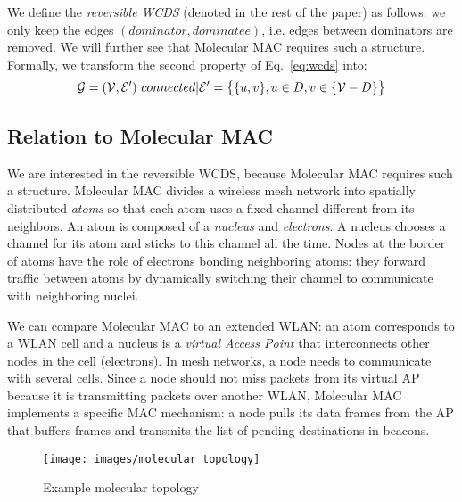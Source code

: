 \documentclass[twoside]{article}
\begin{document}
We define the \emph{reversible WCDS} (denoted \rwcds in the rest of the paper) as follows: we only keep the
edges $(dominator,dominatee)$, i.e. edges between dominators are
removed. We will further see that Molecular MAC requires such a
structure. Formally, we transform the second property of
Eq.~\ref{eq:wcds} into:
\begin{equation}
	\mathcal{G}=(\mathcal{V},\mathcal{E}')\ connected | \mathcal{E}'=\big\{ \{u,v\},  u  \in D, v \in \{\mathcal{V}-D\}\big\}
\label{eq:reversible_wcds}
\end{equation}




\subsection{Relation to Molecular MAC}

We are interested in the reversible WCDS, because Molecular MAC
\cite{molecular09rr} requires such a structure.  Molecular MAC divides
a wireless mesh network into spatially distributed \emph{atoms} so that each
atom uses a fixed channel different from its neighbors. An atom is
composed of a \emph{nucleus} and \emph{electrons}. A nucleus chooses a
channel for its atom and sticks to this channel all the time.  Nodes
at the border of atoms have the role of electrons bonding neighboring
atoms: they forward traffic between atoms by dynamically switching
their channel to communicate with neighboring nuclei.

We can compare Molecular MAC to an extended WLAN: an atom corresponds
to a WLAN cell and a nucleus is a \emph{virtual Access Point} that
interconnects other nodes in the cell (electrons). In mesh
networks, a node needs to communicate with several
cells. Since a node should not miss packets from its virtual AP because it is transmitting packets over another WLAN, Molecular MAC
implements a specific MAC mechanism: a node pulls its data frames
from the AP that buffers frames and transmits the list of pending
destinations in beacons.



\begin{figure}
\begin{center}
	\texttt{[image: images/molecular\_topology]}
	\caption{Example molecular topology}
	\label{fig:molecular_topology}
\end{center}
\end{figure}
\end{document}
